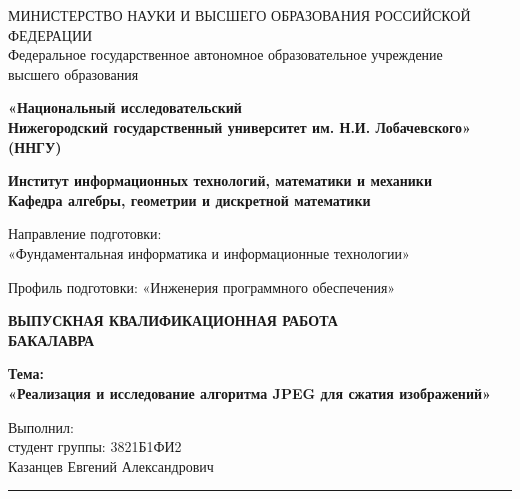 \begin{titlepage}
    \begin{center}
    
    {\normalsize
    МИНИСТЕРСТВО НАУКИ И ВЫСШЕГО ОБРАЗОВАНИЯ РОССИЙСКОЙ ФЕДЕРАЦИИ\\
    Федеральное государственное автономное образовательное учреждение\\
    высшего образования
    }
    
    \textbf{
    «Национальный исследовательский\\
    Нижегородский государственный университет им. Н.И. Лобачевского»\\
    (ННГУ)
    }
    
    \vfill
    
    \textbf{
    Институт информационных технологий, математики и механики\\
    Кафедра алгебры, геометрии и дискретной математики
    }
    
    \vfill
    
    {\centering
    \normalsize
    Направление подготовки:\\
    «Фундаментальная информатика и информационные технологии»

    Профиль подготовки: «Инженерия программного обеспечения»
    \par}
    
    \vfill
    
    \begin{center}
    \textbf{
    ВЫПУСКНАЯ КВАЛИФИКАЦИОННАЯ РАБОТА\\
    БАКАЛАВРА
    }
    
    \vspace{1.5cm}
    
    \textbf{
    Тема:\\
    «Реализация и исследование алгоритма JPEG для сжатия изображений»
    }
    \end{center}
    
    \vfill
    
    \begin{flushright}
    Выполнил:\\
    студент группы: 3821Б1ФИ2 \\
    Казанцев Евгений Александрович \\
    \hspace{4cm} \rule{4cm}{0.4pt} \\ %
    
    \vspace{1cm}
    

\end{flushright}
\end{center}
\end{titlepage}
